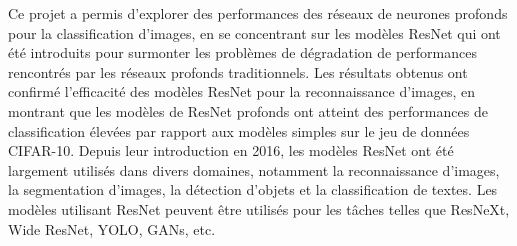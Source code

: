 \documentclass{article}
\begin{document}
Ce projet a permis d'explorer des performances des réseaux de neurones profonds pour la classification d'images,
en se concentrant sur les modèles ResNet qui ont été introduits pour surmonter les problèmes de dégradation de
performances rencontrés par les réseaux profonds traditionnels.
Les résultats obtenus ont confirmé l'efficacité des modèles ResNet pour la reconnaissance d'images, en montrant
que les modèles de ResNet profonds ont atteint des performances de classification élevées par rapport aux modèles
simples sur le jeu de données CIFAR-10.
Depuis leur introduction en 2016, les modèles ResNet ont été largement utilisés dans divers domaines, notamment
la reconnaissance d'images, la segmentation d'images, la détection d'objets et la classification de textes.
Les modèles utilisant ResNet peuvent être utilisés pour les tâches telles que ResNeXt, Wide ResNet, YOLO, GANs, etc.



\end{document}
